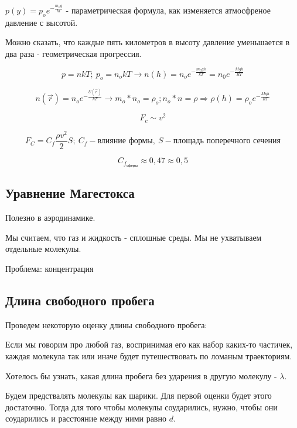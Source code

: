 \section{}

\subsection{}

$p(y) = p_o e^{-\frac{m_o g}{ki}}$ - параметрическая формула, как изменяется атмосфреное давление с высотой.

Можно сказать, что каждые пять километров в высоту давление уменьшается в два раза - геометрическая прогрессия.

\[p = nkT; \ p_o = n_okT \rightarrow n(h) = n_o e^{-\frac{m_0 g h}{kT}} = n_0e^{-\frac{Mgh}{RT}}\]

\[n(\vec{r}) = n_o e^{-\frac{U(\vec{r})}{kT}} \rightarrow m_o * n_o = \rho_o; n_o * n = \rho \Rightarrow \rho(h) = \rho_o e^{-\frac{Mgh}{RT}}\]

\[F_c \sim v^2\]

\[F_C = C_f \frac{\rho v^2}{2} S; \ C_f - \mbox{влияние формы}, \ S - \mbox{площадь поперечного сечения}\]

\[C_{f_{\mbox{сферы}}} \approx 0,47 \approx 0,5\]

\subsection{Уравнение Магестокса}

Полезно в аэродинамике.

Мы считаем, что газ и жидкость - сплошные среды. Мы не ухватываем отдельные молекулы.

Проблема: концентрация 

\subsection{Длина свободного пробега}
Проведем некоторую оценку длины свободного пробега:

Если мы говорим про любой газ, воспринимая его как набор каких-то частичек, каждая молекула так или иначе будет путешествовать по ломаным траекториям.

Хотелось бы узнать, какая длина пробега без ударения в другую молекулу - $\lambda$.

Будем предствалять молекулы как шарики. Для первой оценки будет этого достаточно. Тогда для того чтобы молекулы соударились, нужно, чтобы они соударились и расстояние между ними равно $d$.
 
